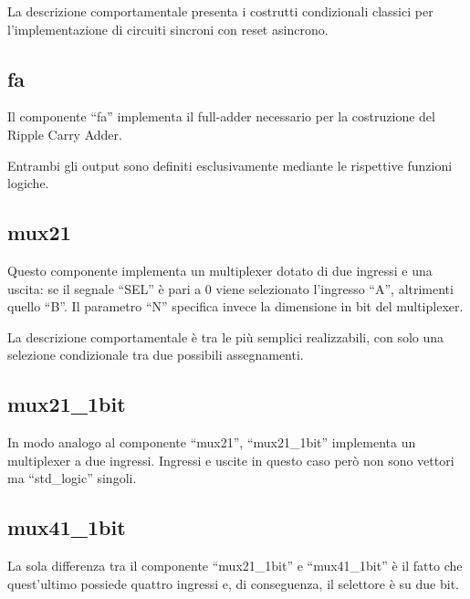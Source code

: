 \documentclass [11pt,a4paper,oneside]{article}
\begin{document}


La descrizione comportamentale presenta i costrutti condizionali
classici per l'implementazione di circuiti sincroni con reset asincrono.



\subsection{fa}

Il componente ``fa'' implementa il full-adder necessario per la
costruzione del Ripple Carry Adder.



Entrambi gli output sono definiti esclusivamente mediante le
rispettive funzioni logiche.



\subsection{mux21}

Questo componente implementa un multiplexer dotato di due ingressi e una
uscita: se il segnale ``SEL'' è pari a 0 viene selezionato l'ingresso
``A'', altrimenti quello ``B''.
Il parametro ``N'' specifica invece la dimensione in bit del multiplexer.



La descrizione comportamentale è tra le più semplici realizzabili, con solo
una selezione condizionale tra due possibili assegnamenti.



\subsection{mux21\_1bit}

In modo analogo al componente ``mux21'', ``mux21\_1bit'' implementa un
multiplexer a due ingressi. Ingressi e uscite in questo caso però non sono 
vettori ma ``std\_logic'' singoli.



\subsection{mux41\_1bit}

La sola differenza tra il componente  ``mux21\_1bit'' e
``mux41\_1bit'' è il fatto che quest'ultimo possiede quattro ingressi e,
di conseguenza, il selettore è su due bit.


\end{document}
